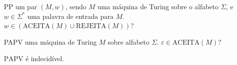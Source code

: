 \documentclass{article}
\begin{document}

\newpage

\section{}

\vspace{6pt}

\problemBox
{PP}
{um par $(M, w)$, sendo $M$ uma máquina de Turing sobre o
alfabeto $\Sigma$, e $w \in \Sigma^{*}$ uma palavra de entrada para $M$.}
{$w \in (\mathrm{ACEITA}(M) \cup \mathrm{REJEITA}(M))$?}

\vspace{8pt}

\problemBox
{PAPV}
{uma máquina de Turing $M$ sobre alfabeto
$\Sigma$.}
{$\varepsilon \in \mathrm{ACEITA}(M)$?}

\vspace{10pt}

\begin{theorem}
    $\mathrm{PAPV}$ é indecidível.
\end{theorem}
\end{document}

